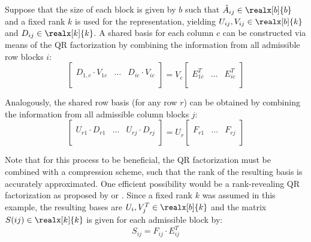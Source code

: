 \noindent Suppose that the size of each block is given by $b$ such that $\Tilde{A}_{ij} \in \realx[b]{b}$ and a fixed rank $k$ is used for the representation, yielding $U_{ij}, V_{ij} \in \realx[b]{k}$ and $D_{ij} \in \realx[k]{k}$. A shared basis for each column $c$ can be constructed via means of the QR factorization by combining the information from all admissible row blocks $i$:
\begin{equation}
  \left[
    \begin{array}{c|c|c}
      & & \\
      D_{1,c}\cdot V_{1c} &\dots & D_{ic}\cdot V_{ic} \\
      & & \\
    \end{array}
  \right] = V_c
  \left[
    \begin{array}{c|c|c}
      & & \\
      E_{1c}^T &\dots & E_{ic}^T \\
      & & \\
    \end{array}
  \right]
\end{equation}

\noindent Analogously, the shared row basis (for any row $r$) can be obtained by combining the information from all admissible column blocks $j$:
\begin{equation}
  \left[
    \begin{array}{c|c|c}
      & & \\
      U_{r1}\cdot D_{r1} &\dots & U_{rj}\cdot D_{rj} \\
      & & \\
    \end{array}
  \right] = U_r
  \left[
    \begin{array}{c|c|c}
      & & \\
     F_{r1} &\dots & F_{rj} \\
      & & \\
    \end{array}
  \right]
\end{equation}

\noindent Note that for this process to be beneficial, the QR factorization must be combined with a compression scheme, such that the rank of the resulting basis is accurately approximated. One efficient possibility would be a rank-revealing QR factorization as proposed by \cite{hong_rank-revealing_1992} or \cite{gu_efficient_1996}. Since a fixed rank $k$ was assumed in this example, the resulting bases are $U_{i}, V^T_{j} \in \realx[b]{k}$ and the matrix $S(ij) \in \realx[k]{k}$ is given for each admissible block by:
\begin{equation}
    S_{ij}=F_{ij} \cdot E_{ij}^T
\end{equation}

